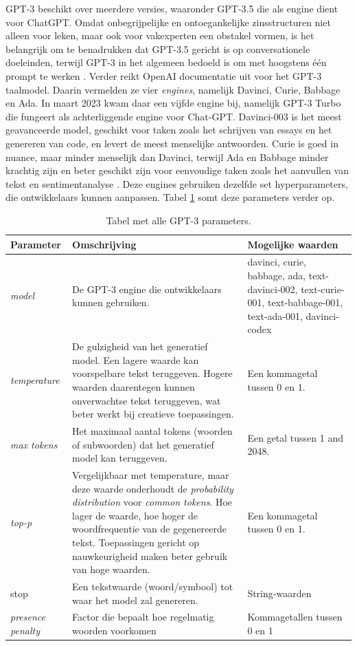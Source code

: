 GPT-3 beschikt over meerdere versies, waaronder GPT-3.5 die als engine dient voor ChatGPT. Omdat onbegrijpelijke en ontoegankelijke zinsstructuren niet alleen voor leken, maar ook voor vakexperten een obstakel vormen, is het belangrijk om te benadrukken dat GPT-3.5 gericht is op conversationele doeleinden, terwijl GPT-3 in het algemeen bedoeld is om met hoogstens één prompt te werken \autocite{McNutt2014, Hubbard2017}. Verder reikt OpenAI documentatie uit voor het GPT-3 taalmodel. Daarin vermelden ze vier \textit{engines}, namelijk Davinci, Curie, Babbage en Ada. In maart 2023 kwam daar een vijfde engine bij, namelijk GPT-3 Turbo die fungeert als achterliggende engine voor Chat-GPT. Davinci-003 is het meest geavanceerde model, geschikt voor taken zoals het schrijven van essays en het genereren van code, en levert de meest menselijke antwoorden. Curie is goed in nuance, maar minder menselijk dan Davinci, terwijl Ada en Babbage minder krachtig zijn en beter geschikt zijn voor eenvoudige taken zoals het aanvullen van tekst en sentimentanalyse \autocite{Brockman2023}. Deze engines gebruiken dezelfde set hyperparameters, die ontwikkelaars kunnen aanpassen. Tabel \ref{table:gpt-3-parameters} somt deze parameters verder op.

\begin{center}
	\begin{table}[H]
	\begin{tabular}{ | m{2.5cm} | m{7cm} | m{4.5cm} | }
		\hline
		\textbf{Parameter} & \textbf{Omschrijving} & \textbf{Mogelijke waarden} \\ \hline
		\textit{model} & De GPT-3 engine die ontwikkelaars kunnen gebruiken. & davinci, curie, babbage, ada, text-davinci-002, text-curie-001, text-babbage-001, text-ada-001, davinci-codex \\ \hline
		\textit{temperature} & De gulzigheid van het generatief model. Een lagere waarde kan voorspelbare tekst teruggeven. Hogere waarden daarentegen kunnen onverwachtse tekst teruggeven, wat beter werkt bij creatieve toepassingen. & Een kommagetal tussen 0 en 1. \\ \hline
		\textit{max tokens} & Het maximaal aantal tokens (woorden of subwoorden) dat het generatief model kan teruggeven. & Een getal tussen 1 and 2048. \\ \hline
		\textit{top-p} & Vergelijkbaar met temperature, maar deze waarde onderhoudt de \textit{probability distribution} voor \textit{common tokens}. Hoe lager de waarde, hoe hoger de woordfrequentie van de gegenereerde tekst. Toepassingen gericht op nauwkeurigheid maken beter gebruik van hoge waarden. & Een kommagetal tussen 0 en 1. \\
		\hline
		stop & Een tekstwaarde (woord/symbool) tot waar het model zal genereren. & String-waarden \\
		\hline
		\textit{presence penalty} & Factor die bepaalt hoe regelmatig woorden voorkomen & Kommagetallen tussen 0 en 1 \\
		\hline
	\end{tabular}
		\caption{Tabel met alle GPT-3 parameters.}
		\label{table:gpt-3-parameters}
	\end{table}
\end{center}

